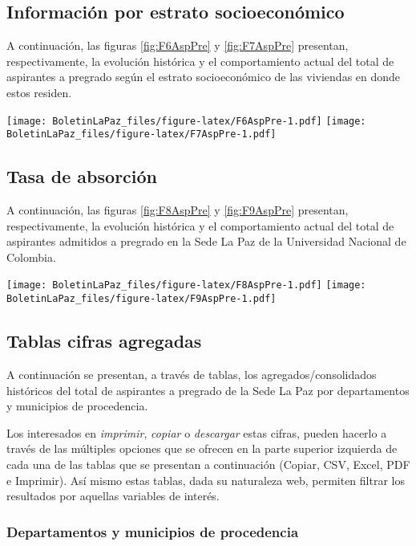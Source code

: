 \documentclass[
]{book}
\begin{document}
\hypertarget{informaciuxf3n-por-estrato-socioeconuxf3mico}{%
\subsection{Información por estrato socioeconómico}\label{informaciuxf3n-por-estrato-socioeconuxf3mico}}

A continuación, las figuras \ref{fig:F6AspPre} y \ref{fig:F7AspPre} presentan, respectivamente, la evolución histórica y el comportamiento actual del total de aspirantes a pregrado según el estrato socioeconómico de las viviendas en donde estos residen.

\texttt{[image: BoletinLaPaz\_files/figure-latex/F6AspPre-1.pdf]}
\texttt{[image: BoletinLaPaz\_files/figure-latex/F7AspPre-1.pdf]}

\hypertarget{tasa-de-absorciuxf3n}{%
\subsection{Tasa de absorción}\label{tasa-de-absorciuxf3n}}

A continuación, las figuras \ref{fig:F8AspPre} y \ref{fig:F9AspPre} presentan, respectivamente, la evolución histórica y el comportamiento actual del total de aspirantes admitidos a pregrado en la Sede La Paz de la Universidad Nacional de Colombia.

\texttt{[image: BoletinLaPaz\_files/figure-latex/F8AspPre-1.pdf]}
\texttt{[image: BoletinLaPaz\_files/figure-latex/F9AspPre-1.pdf]}

\hypertarget{tablas-cifras-agregadas}{%
\subsection{Tablas cifras agregadas}\label{tablas-cifras-agregadas}}

A continuación se presentan, a través de tablas, los agregados/consolidados históricos del total de aspirantes a pregrado de la Sede La Paz por departamentos y municipios de procedencia.

Los interesados en \emph{imprimir}, \emph{copiar} o \emph{descargar} estas cifras, pueden hacerlo a través de las múltiples opciones que se ofrecen en la parte superior izquierda de cada una de las tablas que se presentan a continuación (Copiar, CSV, Excel, PDF e Imprimir). Así mismo estas tablas, dada su naturaleza web, permiten filtrar los resultados por aquellas variables de interés.

\hypertarget{departamentos-y-municipios-de-procedencia}{%
\subsubsection{Departamentos y municipios de procedencia}\label{departamentos-y-municipios-de-procedencia}}
\end{document}
